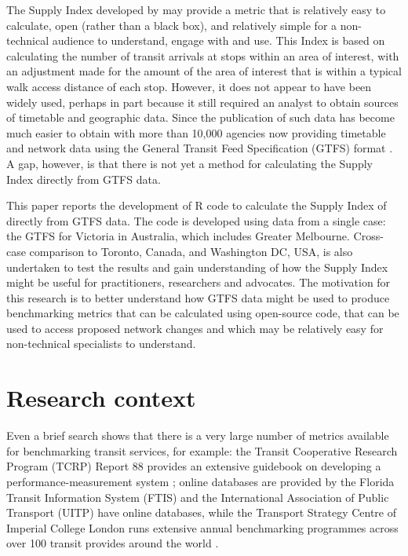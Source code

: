 \documentclass[numbered]{trbunofficial}
\begin{document}
The Supply Index developed by \citet{currie2007identifying} may provide
a metric that is relatively easy to calculate, open (rather than a black
box), and relatively simple for a non-technical audience to understand,
engage with and use. This Index is based on calculating the number of
transit arrivals at stops within an area of interest, with an adjustment
made for the amount of the area of interest that is within a typical
walk access distance of each stop. However, it does not appear to have
been widely used, perhaps in part because it still required an analyst
to obtain sources of timetable and geographic data. Since the
publication of \citet{currie2007identifying} such data has become much
easier to obtain with more than 10,000 agencies now providing timetable
and network data using the General Transit Feed Specification (GTFS)
format \citep{GTFS}. A gap, however, is that there is not yet a method
for calculating the \citet{currie2007identifying} Supply Index directly
from GTFS data.

This paper reports the development of R code to calculate the Supply
Index of \citet{currie2007identifying} directly from GTFS data. The code
is developed using data from a single case: the GTFS for Victoria in
Australia, which includes Greater Melbourne. Cross-case comparison to
Toronto, Canada, and Washington DC, USA, is also undertaken to test the
results and gain understanding of how the Supply Index might be useful
for practitioners, researchers and advocates. The motivation for this
research is to better understand how GTFS data might be used to produce
benchmarking metrics that can be calculated using open-source code, that
can be used to access proposed network changes and which may be
relatively easy for non-technical specialists to understand.

\hypertarget{research-context}{%
\section{Research context}\label{research-context}}

Even a brief search shows that there is a very large number of metrics
available for benchmarking transit services, for example: the Transit
Cooperative Research Program (TCRP) Report 88 provides an extensive
guidebook on developing a performance-measurement system
\citep{Ryus:2003aa}; online databases are provided by the Florida
Transit Information System (FTIS)
\citep{Florida-Transit-Information-System:2018aa} and the International
Association of Public Transport (UITP) \citep{UITP:2015aa} have online
databases, while the Transport Strategy Centre of Imperial College
London runs extensive annual benchmarking programmes across over 100
transit provides around the world
\citep{Imperial-College-London:2023aa}.
\end{document}
